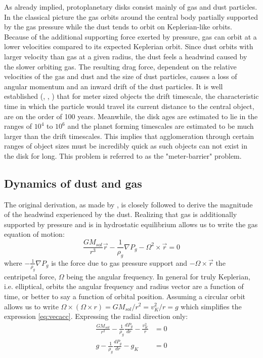 \documentclass[12pt]{article}
\begin{document}
As already implied, protoplanetary disks consist mainly of gas and dust particles. In the classical picture the gas orbits around the central body partially supported by the gas pressure while the dust tends to orbit on Keplerian-like orbits. Because of the additional supporting force exerted by pressure, gas can orbit at a lower velocities compared to its expected Keplerian orbit. Since dust orbits with larger velocity than gas at a given radius, the dust feels a headwind caused by the slower orbiting gas. The resulting drag force, dependent on the relative velocities of the gas and dust and the size of dust particles, causes a loss of angular momentum and an inward drift of the dust particles. It is well established (\cite{Weidenschilling77}, \cite{Armitage07}, \cite{ChiangYoudin10}) that for meter sized objects the drift timescale, the characteristic time in which the particle would travel its current distance to the central object, are on the order of 100 years. Meanwhile, the disk ages are estimated to lie in the ranges of $10^4$ to $10^6$ \citep{Weidenschilling77} and the planet forming timescales are estimated to be much larger than the drift timescales. This implies that agglomeration through certain ranges of object sizes must be incredibly quick as such objects can not exist in the disk for long. This problem is referred to as the "meter-barrier" problem. 

\subsection{Dynamics of dust and gas}
\label{subsec:dynamics}

The original derivation, as made by \citet{Weidenschilling77}, is closely followed to derive the magnitude of the headwind experienced by the dust. Realizing that gas is additionally supported by pressure and is in hydrostatic equilibrium allows us to write the gas equation of motion:
\begin{equation}
    \label{eq:vecacc}
    \frac{GM_{sol}}{r^3}\vec{r} - \frac{1}{\rho_g}\nabla P_g - \Omega^2\times\vec{r} = 0
\end{equation}
where $-\frac{1}{\rho_g}\nabla P_g$ is the force due to gas pressure support and  $-\Omega\times\vec{r}$ the centripetal force, $\Omega$ being the angular frequency. In general for truly Keplerian, i.e. elliptical, orbits the angular frequency and radius vector are a function of time, or better to say a function of orbital position. Assuming a circular orbit allows us to write $\Omega\times(\Omega\times r) = GM_{sol}/r^2 = v_K^2/r = g$ which simplifies the expression \ref{eq:vecacc}. Expressing the radial direction only:
\begin{align}
    \label{eq:radialacc}
    \frac{GM_{sol}}{r^2} - \frac{1}{\rho_g}\frac{dP_g}{dr} - \frac{v_K^2}{r} &= 0 \\
    g - \frac{1}{\rho_g}\frac{dP_g}{dr} - g_K &= 0
\end{align}
\end{document}
